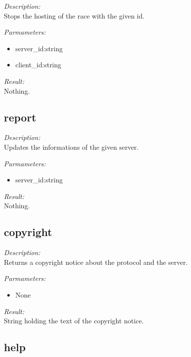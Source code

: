 \begin{description}
\item {\it Description:}\\
Stops the hosting of the race with the given id.
\item {\it Parmameters:}
\begin{itemize}
\item server\_id:string
\item client\_id:string
\end{itemize}
\item {\it Result:}\\
Nothing.
\end{description}

\subsection{report}

\begin{description}
\item {\it Description:}\\
Updates the informations of the given server.
\item {\it Parmameters:}
\begin{itemize}
\item server\_id:string
\end{itemize}
\item {\it Result:}\\
Nothing.
\end{description}

\subsection{copyright}

\begin{description}
\item {\it Description:}\\
Returns a copyright notice about the protocol and the server.
\item {\it Parmameters:}
\begin{itemize}
\item None
\end{itemize}
\item {\it Result:}\\
String holding the text of the copyright notice.
\end{description}

\subsection{help}

